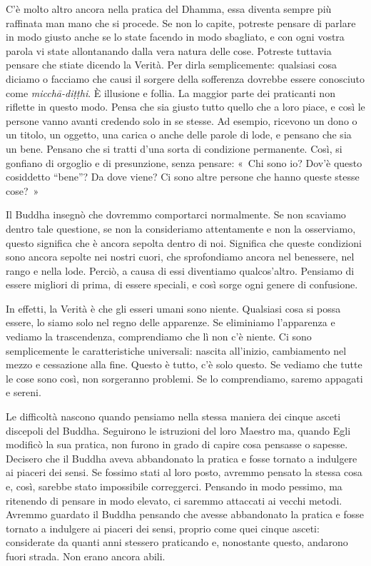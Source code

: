 C'è molto altro ancora nella pratica del Dhamma, essa diventa sempre più
raffinata man mano che si procede. Se non lo capite, potreste pensare di
parlare in modo giusto anche se lo state facendo in modo sbagliato, e
con ogni vostra parola vi state allontanando dalla vera natura delle
cose. Potreste tuttavia pensare che stiate dicendo la Verità. Per dirla
semplicemente: qualsiasi cosa diciamo o facciamo che causi il sorgere
della sofferenza dovrebbe essere conosciuto come \emph{micchā-diṭṭhi}. È
illusione e follia. La maggior parte dei praticanti non riflette in
questo modo. Pensa che sia giusto tutto quello che a loro piace, e così
le persone vanno avanti credendo solo in se stesse. Ad esempio, ricevono
un dono o un titolo, un oggetto, una carica o anche delle parole di
lode, e pensano che sia un bene. Pensano che si tratti d'una sorta di
condizione permanente. Così, si gonfiano di orgoglio e di presunzione,
senza pensare: «~Chi sono io? Dov'è questo cosiddetto ``bene''? Da dove
viene? Ci sono altre persone che hanno queste stesse cose?~»

Il Buddha insegnò che dovremmo comportarci normalmente. Se non scaviamo
dentro tale questione, se non la consideriamo attentamente e non la
osserviamo, questo significa che è ancora sepolta dentro di noi.
Significa che queste condizioni sono ancora sepolte nei nostri cuori,
che sprofondiamo ancora nel benessere, nel rango e nella lode. Perciò, a
causa di essi diventiamo qualcos'altro. Pensiamo di essere migliori di
prima, di essere speciali, e così sorge ogni genere di confusione.

In effetti, la Verità è che gli esseri umani sono niente. Qualsiasi cosa
si possa essere, lo siamo solo nel regno delle apparenze. Se eliminiamo
l'apparenza e vediamo la trascendenza, comprendiamo che lì non c'è
niente. Ci sono semplicemente le caratteristiche universali: nascita
all'inizio, cambiamento nel mezzo e cessazione alla fine. Questo è
tutto, c'è solo questo. Se vediamo che tutte le cose sono così, non
sorgeranno problemi. Se lo comprendiamo, saremo appagati e sereni.

Le difficoltà nascono quando pensiamo nella stessa maniera dei cinque
asceti discepoli del Buddha. Seguirono le istruzioni del loro Maestro
ma, quando Egli modificò la sua pratica, non furono in grado di capire
cosa pensasse o sapesse. Decisero che il Buddha aveva abbandonato la
pratica e fosse tornato a indulgere ai piaceri dei sensi. Se fossimo
stati al loro posto, avremmo pensato la stessa cosa e, così, sarebbe
stato impossibile correggerci. Pensando in modo pessimo, ma ritenendo di
pensare in modo elevato, ci saremmo attaccati ai vecchi metodi. Avremmo
guardato il Buddha pensando che avesse abbandonato la pratica e fosse
tornato a indulgere ai piaceri dei sensi, proprio come quei cinque
asceti: considerate da quanti anni stessero praticando e, nonostante
questo, andarono fuori strada. Non erano ancora abili.

